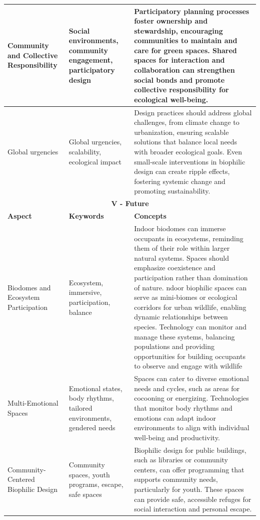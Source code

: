\begin{longtable}{|p{3cm}|p{3.5cm}|p{7.5cm}|}
\hline
Community and Collective Responsibility & Social environments, community engagement, participatory design & Participatory planning processes foster ownership and stewardship, encouraging communities to maintain and care for green spaces. Shared spaces for interaction and collaboration can strengthen social bonds and promote collective responsibility for ecological well-being. \\
\hline
Global urgencies  & Global urgencies, scalability, ecological impact & Design practices should address global challenges, from climate change to urbanization, ensuring scalable solutions that balance local needs with broader ecological goals. Even small-scale interventions in biophilic design can create ripple effects, fostering systemic change and promoting sustainability. \\
\hline
\multicolumn{3}{|c|}{\cellcolor[HTML]{FFF8E1}\textbf{V - Future}} \\ \hline
\textbf{Aspect} & \textbf{Keywords} & \textbf{Concepts} \\
\hline

Biodomes and Ecosystem Participation & Ecosystem, immersive, participation, balance & Indoor biodomes can immerse occupants in ecosystems, reminding them of their role within larger natural systems. Spaces should emphasize coexistence and participation rather than domination of nature. ndoor biophilic spaces can serve as mini-biomes or ecological corridors for urban wildlife, enabling dynamic relationships between species. Technology can monitor and manage these systems, balancing populations and providing opportunities for building occupants to observe and engage with wildlife \\ \hline

Multi-Emotional Spaces & Emotional states, body rhythms, tailored environments, gendered needs & Spaces can cater to diverse emotional needs and cycles, such as areas for cocooning or energizing. Technologies that monitor body rhythms and emotions can adapt indoor environments to align with individual well-being and productivity. \\ \hline

Community-Centered Biophilic Design & Community spaces, youth programs, escape, safe spaces & Biophilic design for public buildings, such as libraries or community centers, can offer programming that supports community needs, particularly for youth. These spaces can provide safe, accessible refuges for social interaction and personal escape. \\ \hline


\end{longtable}
